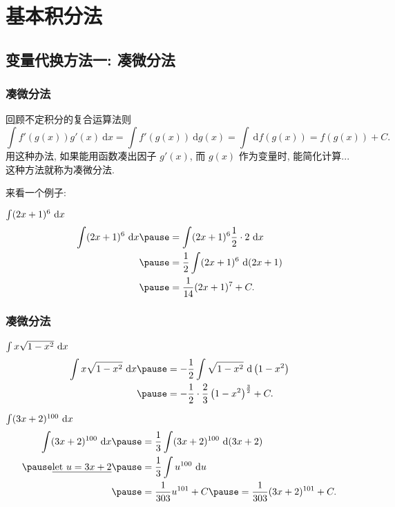 \documentclass[
10pt,
aspectratio=43,
]{beamer}
\begin{document}
\section{基本积分法}

\subsection{变量代换方法一: 凑微分法}


\begin{frame}
	\frametitle{凑微分法}
	\everymath{\displaystyle}
	回顾不定积分的复合运算法则
	$$
		\int f'(g(x))g'(x)\mathrm{~d}x=\int f'(g(x))\mathrm{~d}g(x)=\int \mathrm{~d}f(g(x))= f(g(x))+C.
	$$
	\pause
	用这种办法, 如果能用函数凑出因子 $g'(x)$, 而 $g(x)$ 作为变量时, 能简化计算...这种方法就称为凑微分法.
	\vspace{0.3cm}

	来看一个例子:
	\pause
	\vspace{0.1cm}
	\begin{exampleblock}{$\color{black}\int(2 x+1)^6 \mathrm{~d} x$}
		$$
			\begin{aligned}
				\int(2 x+1)^6 \mathrm{~d} x & \pause=  \int(2 x+1)^6 \frac{1}{2}\cdot 2 \mathrm{~d} x \\
				                            & \pause=  \frac{1}{2}\int(2 x+1)^6 \mathrm{~d} (2x+1)    \\
				                            & \pause= \frac{1}{14}(2x+1)^7+C.
			\end{aligned}
		$$
	\end{exampleblock}

\end{frame}

\begin{frame}
	\frametitle{凑微分法}
	\everymath{\displaystyle}
	\begin{exampleblock}{$\color{black}\int x \sqrt{1-x^2} \mathrm{~d} x$}
		$$
			\begin{aligned}
				\int x \sqrt{1-x^2} \mathrm{~d} x & \pause= -\frac{1}{2} \int \sqrt{1-x^2} \mathrm{~d}\left(1-x^2\right)      \\
				                                  & \pause= -\frac{1}{2} \cdot \frac{2}{3}\left(1-x^2\right)^{\frac{3}{2}}+C.
			\end{aligned}
		$$
	\end{exampleblock}
	\pause
	\begin{exampleblock}{$\color{black}\int (3x+2)^{100} \mathrm{~d}x$}
		$$
			\begin{aligned}
				\int (3x+2)^{100} \mathrm{~d}x      & \pause= \frac{1}{3} \int (3x+2)^{100} \mathrm{~d}(3x+2)               \\
				\pause\underline{\text{let }u=3x+2} & \pause=  \frac{1}{3} \int u^{100} \mathrm{~d}u                        \\
				                                    & \pause= \frac{1}{303} u^{101}+C \pause = \frac{1}{303}(3x+2)^{101}+C.
			\end{aligned}
		$$
	\end{exampleblock}
\end{frame}
\end{document}
